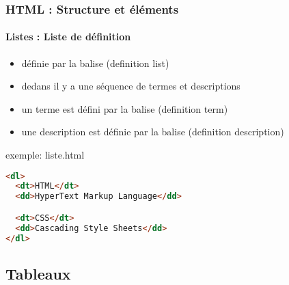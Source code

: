 \documentclass[xcolor=table]{beamer}
\begin{document}
\begin{frame}[fragile]
\frametitle{HTML : Structure et éléments}
\framesubtitle{Listes : Liste de définition}

\begin{minipage}{0.50\textwidth} 
	\begin{itemize}
		\item définie par la balise  (definition list)
		\item dedans il y a une séquence de termes et descriptions
		\item un terme est défini par la balise  (definition term)
		\item une description est définie par la balise  (definition description)
	\end{itemize}
\end{minipage}
%
\begin{minipage}{0.49\textwidth}
\begin{exampleblock}{exemple: liste.html}
\lstset{escapeinside=**}
\scriptsize\bfseries
\begin{lstlisting}[language={html}]
<dl>
  <dt>HTML</dt>
  <dd>HyperText Markup Language</dd>

  <dt>CSS</dt>
  <dd>Cascading Style Sheets</dd>
</dl>
\end{lstlisting}
\end{exampleblock}
\end{minipage}

\end{frame}

\subsection{Tableaux}
\end{document}
